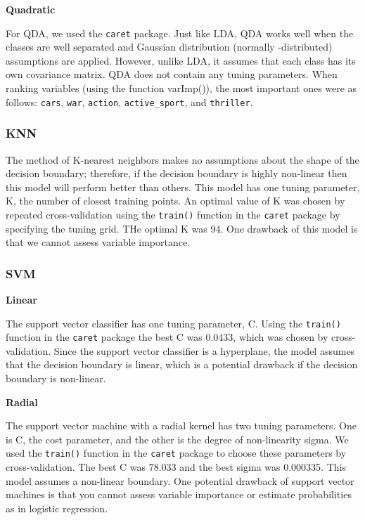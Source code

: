 \documentclass[]{article}
\begin{document}
\textbf{Quadratic}

For QDA, we used the \texttt{caret} package. Just like LDA, QDA works
well when the classes are well separated and Gaussian distribution
(normally -distributed) assumptions are applied. However, unlike LDA, it
assumes that each class has its own covariance matrix. QDA does not
contain any tuning parameters. When ranking variables (using the
function varImp()), the most important ones were as follows:
\texttt{cars}, \texttt{war}, \texttt{action}, \texttt{active\_sport},
and \texttt{thriller}.

\subsubsection{KNN}\label{knn}

The method of K-nearest neighbors makes no assumptions about the shape
of the decision boundary; therefore, if the decision boundary is highly
non-linear then this model will perform better than others. This model
has one tuning parameter, K, the number of closest training points. An
optimal value of K was chosen by repeated cross-validation using the
\texttt{train()} function in the \texttt{caret} package by specifying
the tuning grid. THe optimal K was 94. One drawback of this model is
that we cannot assess variable importance.

\subsubsection{SVM}\label{svm}

\textbf{Linear}

The support vector classifier has one tuning parameter, C. Using the
\texttt{train()} function in the \texttt{caret} package the best C was
0.0433, which was chosen by cross-validation. Since the support vector
classifier is a hyperplane, the model assumes that the decision boundary
is linear, which is a potential drawback if the decision boundary is
non-linear.

\textbf{Radial}

The support vector machine with a radial kernel has two tuning
parameters. One is C, the cost parameter, and the other is the degree of
non-linearity sigma. We used the \texttt{train()} function in the
\texttt{caret} package to choose these parameters by cross-validation.
The best C was 78.033 and the best sigma was 0.000335. This model
assumes a non-linear boundary. One potential drawback of support vector
machines is that you cannot assess variable importance or estimate
probabilities as in logistic regression.
\end{document}
